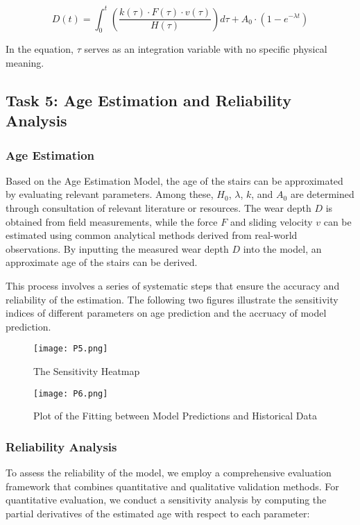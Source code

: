 \documentclass{mcmthesis}
\begin{document}
\begin{equation} 
\label{eq:10}
D(t) = \int_0^t \left( \frac{k(\tau) \cdot F(\tau) \cdot v(\tau)}{H(\tau)} \right) d\tau + A_0 \cdot \left(1 - e^{-\lambda t}\right)
\end{equation}

In the equation, \( \tau \) serves as an integration variable with no specific physical meaning.

\subsection{Task 5: Age Estimation and Reliability Analysis}
\subsubsection{Age Estimation}
\hspace{1.5em}Based on the Age Estimation Model, the age of the stairs can be approximated by evaluating relevant parameters. Among these, \( H_0 \), \( \lambda \), \( k \), and \( A_0 \) are determined through consultation of relevant literature or resources. The wear depth \( D \) is obtained from field measurements, while the force \( F \) and sliding velocity \( v \) can be estimated using common analytical methods derived from real-world observations. By inputting the measured wear depth \( D \) into the model, an approximate age of the stairs can be derived.

This process involves a series of systematic steps that ensure the accuracy and reliability of the estimation. The following two figures illustrate the sensitivity indices of different parameters on age prediction and the accruacy of model prediction.

\begin{figure}[htp]
    \centering
    \texttt{[image: P5.png]}
    \caption{The Sensitivity Heatmap}
\end{figure}

\begin{figure}[htp]
    \centering
    \texttt{[image: P6.png]}
    \caption{Plot of the Fitting between Model Predictions and Historical Data}
\end{figure}

\newpage
\subsubsection{Reliability Analysis}
\hspace{1.5em}To assess the reliability of the model, we employ a comprehensive evaluation framework that combines quantitative and qualitative validation methods. For quantitative evaluation, we conduct a sensitivity analysis by computing the partial derivatives of the estimated age with respect to each parameter:
\end{document}
